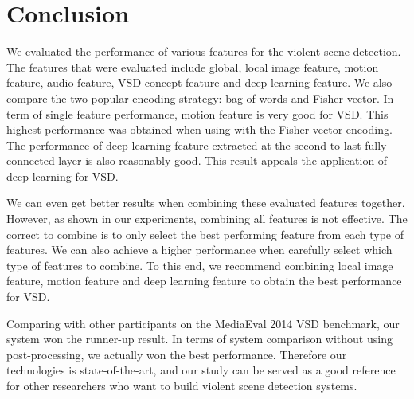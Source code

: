 \documentclass[twocolumn]{bmcart}%
\begin{document}
\section{Conclusion}
We evaluated the performance of various features for the violent scene detection. The features that were evaluated include global, local image feature, motion feature, audio feature, VSD concept feature and deep learning feature. We also compare the two popular encoding strategy: bag-of-words and Fisher vector. In term of single feature performance, motion feature is very good for VSD. This highest performance was obtained when using with the Fisher vector encoding. The performance of deep learning feature extracted at the second-to-last fully connected layer is also reasonably good. This result appeals the application of deep learning for VSD.   

We can even get better results when combining these evaluated features together. However, as shown in our experiments, combining all features is not effective. The correct to combine is to only select the best performing feature from each type of features. We can also achieve a higher performance when carefully select which type of features to combine. To this end, we recommend combining local image feature, motion feature and deep learning feature to obtain the best performance for VSD.

Comparing with other participants on the MediaEval 2014 VSD benchmark, our system won the runner-up result. In terms of system comparison without using post-processing, we actually won the best performance. Therefore our technologies is state-of-the-art, and our study can be served as a good reference for other researchers who want to build violent scene detection systems. 


\end{document}
